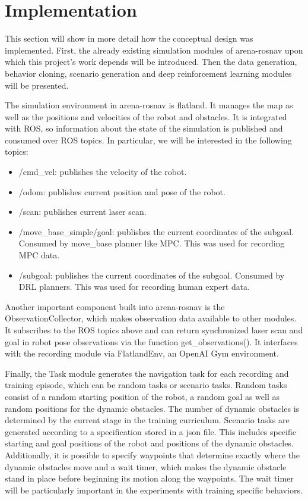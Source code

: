 \chapter{Implementation}
This section will show in more detail how the conceptual design was implemented. First, the already existing simulation modules of arena-rosnav upon which this project’s work depends will be introduced. Then the data generation, behavior cloning, scenario generation and deep reinforcement learning modules will be presented.

The simulation environment in arena-rosnav is flatland. It manages the map as well as the positions and velocities of the robot and obstacles. It is integrated with ROS, so information about the state of the simulation is published and consumed over ROS topics. In particular, we will be interested in the following topics:

\begin{itemize}
    \item /cmd\_vel: publishes the velocity of the robot.
    \item /odom: publishes current position and pose of the robot.
    \item /scan: publishes current laser scan.
    \item /move\_base\_simple/goal: publishes the current coordinates of the subgoal. Consumed by move\_base planner like MPC. This was used for recording MPC data.
    \item /subgoal: publishes the current coordinates of the subgoal. Consumed by DRL planners. This was used for recording human expert data.
\end{itemize}

Another important component built into arena-rosnav is the ObservationCollector, which makes observation data available to other modules. It subscribes to the ROS topics above and can return synchronized laser scan and goal in robot pose observations via the function get\_observations(). It interfaces with the recording module via FlatlandEnv, an OpenAI Gym environment.

Finally, the Task module generates the navigation task for each recording and training episode, which can be random tasks or scenario tasks. Random tasks consist of a random starting position of the robot, a random goal as well as random positions for the dynamic obstacles. The number of dynamic obstacles is determined by the current stage in the training curriculum. Scenario tasks are generated according to a specification stored in a json file. This includes specific starting and goal positions of the robot and positions of the dynamic obstacles. Additionally, it is possible to specify waypoints that determine exactly where the dynamic obstacles move and a wait timer, which makes the dynamic obstacle stand in place before beginning its motion along the waypoints. The wait timer will be particularly important in the experiments with training specific behaviors.





